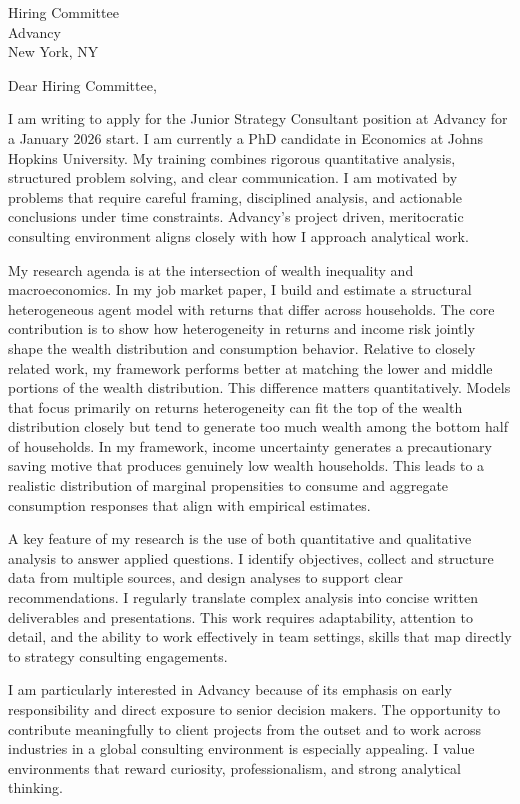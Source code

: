 \documentclass[11pt]{letter}
\begin{document}
\begin{letter}{Hiring Committee \\ Advancy \\ New York, NY}

\opening{Dear Hiring Committee,}

I am writing to apply for the Junior Strategy Consultant position at Advancy for a January 2026 start. I am currently a PhD candidate in Economics at Johns Hopkins University. My training combines rigorous quantitative analysis, structured problem solving, and clear communication. I am motivated by problems that require careful framing, disciplined analysis, and actionable conclusions under time constraints. Advancy’s project driven, meritocratic consulting environment aligns closely with how I approach analytical work.

My research agenda is at the intersection of wealth inequality and macroeconomics. In my job market paper, I build and estimate a structural heterogeneous agent model with returns that differ across households. The core contribution is to show how heterogeneity in returns and income risk jointly shape the wealth distribution and consumption behavior. Relative to closely related work, my framework performs better at matching the lower and middle portions of the wealth distribution. This difference matters quantitatively. Models that focus primarily on returns heterogeneity can fit the top of the wealth distribution closely but tend to generate too much wealth among the bottom half of households. In my framework, income uncertainty generates a precautionary saving motive that produces genuinely low wealth households. This leads to a realistic distribution of marginal propensities to consume and aggregate consumption responses that align with empirical estimates.

A key feature of my research is the use of both quantitative and qualitative analysis to answer applied questions. I identify objectives, collect and structure data from multiple sources, and design analyses to support clear recommendations. I regularly translate complex analysis into concise written deliverables and presentations. This work requires adaptability, attention to detail, and the ability to work effectively in team settings, skills that map directly to strategy consulting engagements.

I am particularly interested in Advancy because of its emphasis on early responsibility and direct exposure to senior decision makers. The opportunity to contribute meaningfully to client projects from the outset and to work across industries in a global consulting environment is especially appealing. I value environments that reward curiosity, professionalism, and strong analytical thinking.


\end{letter}
\end{document}
